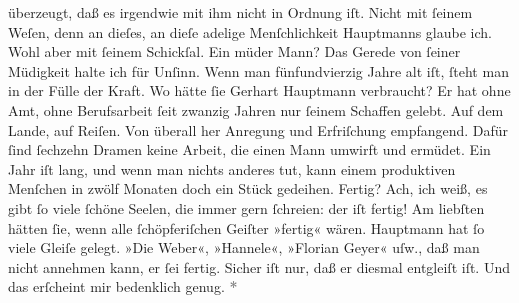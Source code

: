 \begin{ledgroupsized}[t]{13cm}
{{                  überzeugt, daß es irgendwie mit ihm nicht in Ordnung iſt. Nicht mit ſeinem Weſen,
                  denn an dieſes, an dieſe adelige Menſchlichkeit Hauptmanns glaube ich. Wohl aber mit ſeinem Schickſal. Ein müder Mann?
                  Das Gerede von ſeiner Müdigkeit halte ich für Unſinn. Wenn man fünfundvierzig
                  Jahre alt iſt, ſteht man in der Fülle der Kraft. Wo hätte ſie Gerhart Hauptmann verbraucht? Er hat ohne Amt, ohne
                  Berufsarbeit ſeit zwanzig Jahren nur ſeinem Schaffen gelebt. Auf dem Lande, auf
                  Reiſen. Von überall her Anregung und Erfriſchung empfangend. Dafür ſind ſechzehn
                  Dramen keine Arbeit, die einen Mann umwirft und ermüdet. Ein Jahr iſt lang, und
                  wenn man nichts anderes tut, kann einem produktiven Menſchen in zwölf Monaten doch
                  ein Stück gedeihen. Fertig? Ach, ich weiß, es gibt ſo viele ſchöne Seelen, die
                  immer gern ſchreien: der iſt fertig! Am liebſten hätten ſie, wenn alle
                  ſchöpferiſchen Geiſter »fertig« wären. Hauptmann hat ſo viele Gleiſe gelegt. »Die Weber«, »Hannele«, »Florian Geyer« uſw., daß man nicht annehmen
                  kann, er ſei fertig. Sicher iſt nur, daß er diesmal entgleiſt iſt. Und das
                  erſcheint mir bedenklich genug.}}\pend
           \pstart
           \centering{}\textcolor{gray}{\textbf{*}}\pend

\end{ledgroupsized}
